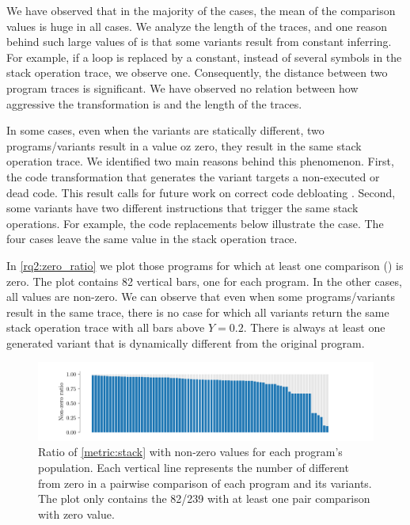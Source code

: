 We have observed that in the majority of the cases, the mean of the comparison values is huge in all cases. We analyze the length of the traces, and one reason behind such large values of \DTW is that some variants result from constant inferring. For example, if a loop is replaced by a constant, instead of several symbols in the stack operation trace, we observe one. Consequently, the distance between two program traces is significant. We have observed no relation between how aggressive the transformation is and the length of the traces.  

In some cases, even when the variants are statically different, two programs/variants result in a \DTW value oz zero, \ie they result in the same stack operation trace. We identified two main reasons behind this phenomenon. First, the code transformation that generates the variant targets a non-executed or dead code. This result calls for future work on correct code debloating \citationneeded. Second, some variants have two different instructions that trigger the same stack operations. For example, the code replacements below illustrate the case. The four cases leave the same value in the stack operation trace.





In \autoref{rq2:zero_ratio} we plot those programs for which at least one comparison (\DTW) is zero. The plot contains 82 vertical bars, one for each program. In the other cases, all \DTW values are non-zero. We can observe that even when some programs/variants result in the same trace, there is no case for which all variants return the same stack operation trace with all bars above $Y=0.2$. There is always at least one generated variant that is dynamically different from the original program. 

\newcommand{\zerocountprogs}{82\xspace}

\begin{figure}[h]
    \centering
    \hspace*{-0.1\linewidth}\includegraphics[width=1.2\linewidth]{plots/non_zero_ratio.pdf}
    \caption{ Ratio of \autoref{metric:stack} with non-zero values for each program's population. Each vertical line represents the number of \DTW different from zero in a pairwise comparison of each program and its variants. The plot only contains the \zerocountprogs/239  with at least one pair comparison with zero value.}
    \label{rq2:zero_ratio}
\end{figure}

